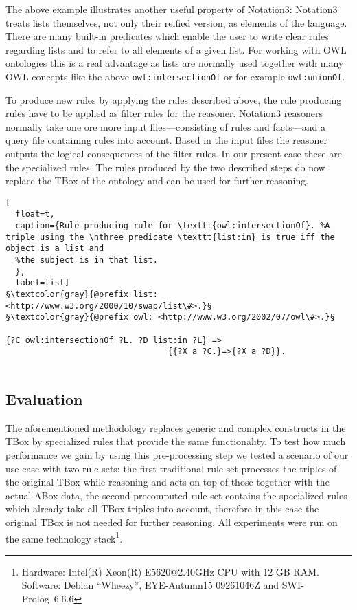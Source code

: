 The above example illustrates 
another useful property of Notation3: 
Notation3 treats lists themselves, not only their reified version, as elements of the language. There are many built-in predicates 
which enable the user to write 
clear rules regarding lists and to refer to all elements of a given list. For working with OWL ontologies this is a real advantage as lists are normally used
together with many OWL concepts 
like the above \texttt{owl:intersectionOf} or 
for example \texttt{owl:unionOf}.

To produce new rules by applying the rules described above, the rule producing rules have to be applied as filter rules for the reasoner. Notation3 reasoners
normally take one ore more input files---consisting of rules and facts---and a query file containing rules into account. Based in the input files the reasoner 
outputs the logical consequences of the filter rules. In our present case these are the specialized rules.
The rules produced by the two described steps do now replace the TBox of the ontology and can be used for further reasoning.


\begin{lstlisting}[
  float=t,
  caption={Rule-producing rule for \texttt{owl:intersectionOf}. %A triple using the \nthree predicate \texttt{list:in} is true iff the object is a list and 
  %the subject is in that list.  
  },
  label=list]
§\textcolor{gray}{@prefix list: <http://www.w3.org/2000/10/swap/list\#>.}§
§\textcolor{gray}{@prefix owl: <http://www.w3.org/2002/07/owl\#>.}§

{?C owl:intersectionOf ?L. ?D list:in ?L} => 
                                 {{?X a ?C.}=>{?X a ?D}}.
                              
\end{lstlisting}












\subsection{Evaluation}\label{ev}
The aforementioned methodology replaces generic and complex constructs in the TBox
by specialized rules that provide the same functionality.
To test how much performance we gain by using this pre-processing step
we tested a scenario of our use case with two rule sets: the first traditional rule set processes the triples of the original TBox while reasoning and 
acts on top of those together with the actual ABox data,
the second precomputed rule set contains the specialized rules which already take all TBox triples into account, 
therefore in this case the original TBox is not needed for 
further reasoning.
All experiments were run on the same technology stack\footnote{Hardware: Intel(R) Xeon(R) E5620@2.40GHz CPU with 12 GB RAM. Software: Debian ``Wheezy'', 
EYE-Autumn15 09261046Z and SWI-Prolog~6.6.6}.



